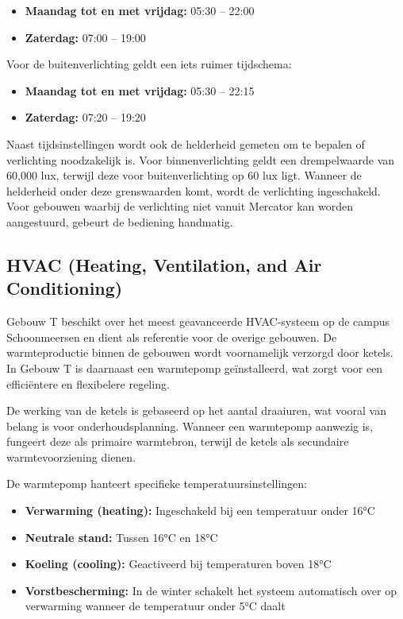 \begin{itemize}
    \item \textbf{Maandag tot en met vrijdag:} 05:30 -- 22:00
    \item \textbf{Zaterdag:} 07:00 -- 19:00
\end{itemize}

Voor de buitenverlichting geldt een iets ruimer tijdschema:

\begin{itemize}
    \item \textbf{Maandag tot en met vrijdag:} 05:30 -- 22:15
    \item \textbf{Zaterdag:} 07:20 -- 19:20
\end{itemize}

Naast tijdsinstellingen wordt ook de helderheid gemeten om te bepalen of verlichting noodzakelijk is. Voor binnenverlichting geldt een drempelwaarde van 60,000 lux, terwijl deze voor buitenverlichting op 60 lux ligt. Wanneer de helderheid onder deze grenswaarden komt, wordt de verlichting ingeschakeld. Voor gebouwen waarbij de verlichting niet vanuit Mercator kan worden aangestuurd, gebeurt de bediening handmatig.

\subsection{HVAC (Heating, Ventilation, and Air Conditioning)}
Gebouw T beschikt over het meest geavanceerde HVAC-systeem op de campus Schoonmeersen en dient als referentie voor de overige gebouwen. De warmteproductie binnen de gebouwen wordt voornamelijk verzorgd door ketels. In Gebouw T is daarnaast een warmtepomp geïnstalleerd, wat zorgt voor een efficiëntere en flexibelere regeling.

De werking van de ketels is gebaseerd op het aantal draaiuren, wat vooral van belang is voor onderhoudsplanning. Wanneer een warmtepomp aanwezig is, fungeert deze als primaire warmtebron, terwijl de ketels als secundaire warmtevoorziening dienen.

De warmtepomp hanteert specifieke temperatuursinstellingen:

\begin{itemize}
    \item \textbf{Verwarming (heating):} Ingeschakeld bij een temperatuur onder 16°C
    \item \textbf{Neutrale stand:} Tussen 16°C en 18°C
    \item \textbf{Koeling (cooling):} Geactiveerd bij temperaturen boven 18°C
    \item \textbf{Vorstbescherming:} In de winter schakelt het systeem automatisch over op verwarming wanneer de temperatuur onder 5°C daalt
\end{itemize}

